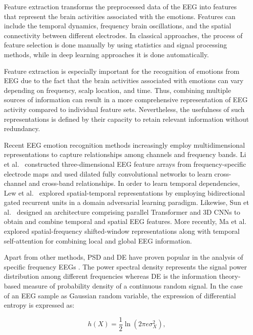 \documentclass[ASNA,twocolumn]{USG}
\begin{document}
Feature extraction transforms the preprocessed data of the EEG into features that represent the brain activities associated with the emotions. Features can include the temporal dynamics, frequency brain oscillations, and the spatial connectivity between different electrodes. In classical approaches, the process of feature selection is done manually by using statistics and signal processing methods, while in deep learning approaches it is done automatically.

Feature extraction is especially important for the recognition of emotions from EEG due to the fact that the brain activities associated with emotions can vary depending on frequency, scalp location, and time. Thus, combining multiple sources of information can result in a more comprehensive representation of EEG activity compared to individual feature sets. Nevertheless, the usefulness of such representations is defined by their capacity to retain relevant information without redundancy.

Recent EEG emotion recognition methods increasingly employ multidimensional representations to capture relationships among channels and frequency bands. Li et al.~\cite{li2021eeg} constructed three-dimensional EEG feature arrays from frequency-specific electrode maps and used dilated fully convolutional networks to learn cross-channel and cross-band relationships. In order to learn temporal dependencies, Lew et al.~\cite{lew2020eeg} explored spatial-temporal representations by employing bidirectional gated recurrent units in a domain adversarial learning paradigm. Likewise, Sun et al.~\cite{sun2022multi} designed an architecture comprising parallel Transformer and 3D CNNs to obtain and combine temporal and spatial EEG features. More recently, Ma et al.~\cite{ma2025sfswts} explored spatial-frequency shifted-window representations along with temporal self-attention for combining local and global EEG information.

Apart from other methods, PSD and DE have proven popular in the analysis of specific frequency EEGs \cite{ouyang2022effect}. The power spectral density represents the signal power distribution among different frequencies whereas DE is the information theory-based measure of probability density of a continuous random signal. In the case of an EEG sample as Gaussian random variable, the expression of differential entropy is expressed as:

\begin{equation}
    h(X) = \frac{1}{2}\ln\left(2\pi e\sigma_X^2\right),
    \label{eq:feature_de}
\end{equation}
\end{document}
